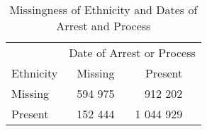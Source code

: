 \begin{table}[t]

\caption{\label{tab:missingness_of_ethnicity_and_date}Missingness of Ethnicity and Dates of Arrest and Process}
\centering
\begin{tabular}{lrr}
\toprule
\multicolumn{1}{c}{ } & \multicolumn{3}{c}{Date of Arrest or Process} \\
\cmidrule(l{2pt}r{2pt}){2-4}
Ethnicity & Missing & Present\\
\midrule
Missing & 594 975 & 912 202\\
Present & 152 444 & 1 044 929\\
\bottomrule
\end{tabular}
\end{table}
